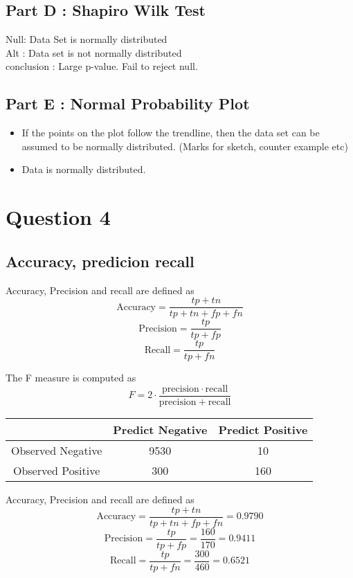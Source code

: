 \documentclass[]{article}
\begin{document}
\subsection*{Part D : Shapiro Wilk Test}
Null: Data Set is normally distributed\\
Alt : Data set is not normally distributed\\
conclusion : Large p-value. Fail to reject null.
\subsection*{Part E : Normal Probability Plot}
\begin{itemize}
\item If the points on the plot follow the trendline, then the data set can be assumed to be normally distributed. (Marks for sketch, counter example etc)
\item Data is normally distributed.
\end{itemize}
\newpage
\section*{Question 4}

\subsection*{Accuracy, predicion recall}
Accuracy, Precision and recall are defined as
\[\mbox{Accuracy}=\frac{tp+tn}{tp+tn+fp+fn} \]
\[\mbox{Precision}=\frac{tp}{tp+fp} \] 
\[\mbox{Recall}=\frac{tp}{tp+fn} \]

The F measure is computed as
\[F = 2 \cdot \frac{\mathrm{precision} \cdot \mathrm{recall}}{ \mathrm{precision} + \mathrm{recall}}\]
\begin{center}
\begin{tabular}{|c|c|c|}
\hline  & \phantom{spa}Predict Negative\phantom{spa} & \phantom{spa}Predict Positive\phantom{spa} \\ 
\hline\phantom{spa} Observed Negative \phantom{spa}&	9530	&	10	\\ 
\hline \phantom{spa}Observed Positive\phantom{spa} & 	300	&	160	\\ 
\hline 
\end{tabular} 
\end{center}
Accuracy, Precision and recall are defined as
\[\mbox{Accuracy}=\frac{tp+tn}{tp+tn+fp+fn} = 0.9790 \]
\[\mbox{Precision}=\frac{tp}{tp+fp} = \frac{160}{170} = 0.9411\] 
\[\mbox{Recall}=\frac{tp}{tp+fn} =\frac{300}{460} = 0.6521 \]
\end{document}
